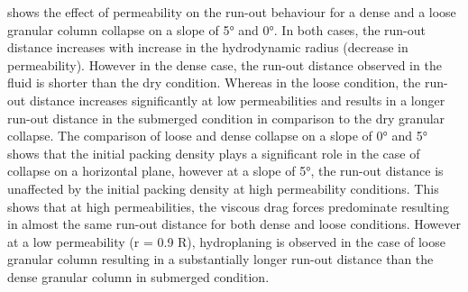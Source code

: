  shows the effect of permeability on the 
run-out behaviour for a dense and a loose granular column collapse on a slope 
of 5\si{\degree} and 0\si{\degree}. In both cases, the run-out distance 
increases with increase in the hydrodynamic radius (decrease in permeability). 
However in the dense case, the run-out distance observed in the fluid is 
shorter than the dry condition. Whereas in the loose condition, the run-out 
distance increases significantly at low permeabilities and results in a longer 
run-out distance in the submerged condition in comparison to the dry granular 
collapse. The comparison of loose and dense collapse on a slope of 
0\si{\degree} and 5\si{\degree} shows that the initial packing density plays a 
significant role in the case of collapse on a horizontal plane, however at a 
slope of 5\si{\degree}, the run-out distance is unaffected by the initial 
packing density at high permeability conditions. This shows that at high 
permeabilities, the viscous drag forces predominate resulting in almost the 
same run-out distance for both dense and loose conditions. However at a low 
permeability (r = 0.9 R), hydroplaning is observed in the case of loose 
granular column resulting in a substantially longer run-out distance than the 
dense granular column in submerged condition. 
%
